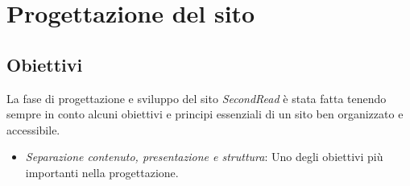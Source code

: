 \section{Progettazione del sito}\label{sec:progettazionesito}

\subsection{Obiettivi}
La fase di progettazione e sviluppo del sito \textit{SecondRead} è stata fatta tenendo sempre in conto alcuni obiettivi e principi essenziali di un sito ben organizzato e accessibile.
\begin{itemize}
	\item \textit{Separazione contenuto, presentazione e struttura}: Uno degli obiettivi più importanti nella progettazione. 
	

\end{itemize}
